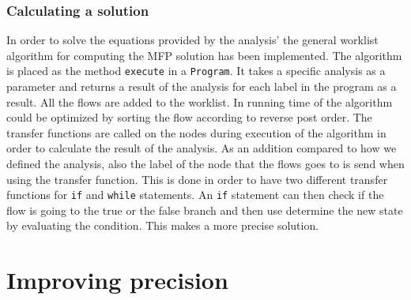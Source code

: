 \subsection{Calculating a solution}
In order to solve the equations provided by the analysis' the general worklist algorithm for computing the MFP solution has been implemented. The algorithm is placed as the method \texttt{execute} in a \texttt{Program}. It takes a specific analysis as a parameter and returns a result of the analysis for each label in the program as a result. All the flows are added to the worklist. In running time of the algorithm could be optimized by sorting the flow according to reverse post order. The transfer functions are called on the nodes during execution of the algorithm in order to calculate the result of the analysis. As an addition compared to how we defined the analysis, also the label of the node that the flows goes to is send when using the transfer function. This is done in order to have two different transfer functions for \texttt{if} and \texttt{while} statements. An \texttt{if} statement can then check if the flow is going to the true or the false branch and then use determine the new state by evaluating the condition. This makes a more precise solution.

\chapter{Improving precision}
